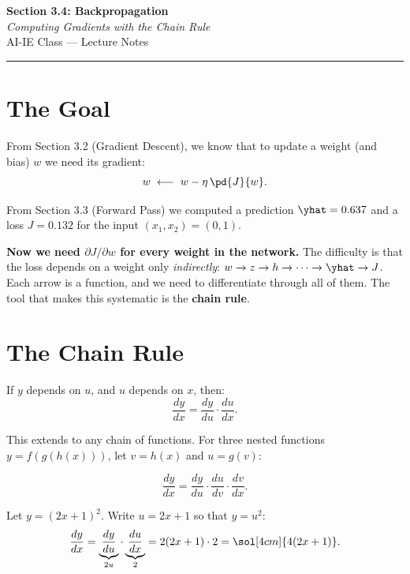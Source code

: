\documentclass[12pt, a4paper]{article}
\begin{document}
\begin{center}
  {\LARGE \textbf{Section 3.4: Backpropagation}} \\[0.3em]
  {\large\itshape Computing Gradients with the Chain Rule} \\[0.5em]
  {\large AI-IE Class --- Lecture Notes}%
  \ifstudentmode
  \fi
\end{center}

\vspace{1em}
\hrule
\vspace{1.5em}

\section{The Goal}

From Section 3.2 (Gradient Descent), we know that to update a weight (and bias) $w$
we need its gradient:
\[
  w \;\longleftarrow\; w - \eta \,\pd{J}{w}.
\]

From Section 3.3 (Forward Pass) we computed a prediction $\yhat = 0.637$
and a loss $J = 0.132$ for the input $(x_1, x_2) = (0, 1)$.

\textbf{Now we need $\partial J / \partial w$ for every weight in the
  network.}
The difficulty is that the loss depends on a weight only \emph{indirectly}:
$w \to z \to h \to \cdots \to \yhat \to J$.
Each arrow is a function, and we need to differentiate through all of them.
The tool that makes this systematic is the \textbf{chain rule}.

\section{The Chain Rule}

If $y$ depends on $u$, and $u$ depends on $x$, then:
\[
  \frac{dy}{dx} = \frac{dy}{du} \cdot \frac{du}{dx}.
\]

This extends to any chain of functions.
For three nested functions $y = f(g(h(x)))$, let $v = h(x)$ and $u = g(v)$:

\[
  \frac{dy}{dx}
  = \frac{dy}{du} \cdot \frac{du}{dv} \cdot \frac{dv}{dx}.
\]

\begin{example}
  Let $y = (2x+1)^2$.  Write $u = 2x+1$ so that $y = u^2$:
  \[
    \frac{dy}{dx}
    = \underbrace{\frac{dy}{du}}_{2u}
    \cdot
    \underbrace{\frac{du}{dx}}_{2}
    = 2(2x+1) \cdot 2
    = \sol[4cm]{4(2x+1)}.
  \]
\end{example}
\end{document}
